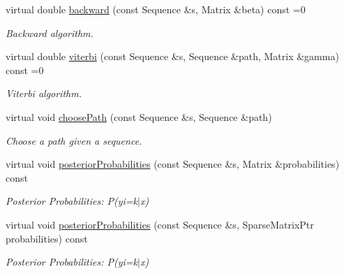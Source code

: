 \begin{DoxyCompactItemize}
virtual double \hyperlink{classtops_1_1DecodableModel_ae2339a90c124e65aabbb9887c04239ff}{backward} (const Sequence \&s, Matrix \&beta) const =0
\begin{DoxyCompactList}\small\item\em Backward algorithm. \end{DoxyCompactList}\item 
\mbox{\label{classtops_1_1DecodableModel_ab5e3ec33745b4189e8d466895fb51df8}} 
virtual double \hyperlink{classtops_1_1DecodableModel_ab5e3ec33745b4189e8d466895fb51df8}{viterbi} (const Sequence \&s, Sequence \&path, Matrix \&gamma) const =0
\begin{DoxyCompactList}\small\item\em Viterbi algorithm. \end{DoxyCompactList}\item 
\mbox{\label{classtops_1_1DecodableModel_a487a5950464543c60d748fb637f4ed7f}} 
virtual void \hyperlink{classtops_1_1DecodableModel_a487a5950464543c60d748fb637f4ed7f}{choose\+Path} (const Sequence \&s, Sequence \&path)
\begin{DoxyCompactList}\small\item\em Choose a path given a sequence. \end{DoxyCompactList}\item 
\mbox{\label{classtops_1_1DecodableModel_a5836caa71f5566958086c2fb79b93f22}} 
virtual void \hyperlink{classtops_1_1DecodableModel_a5836caa71f5566958086c2fb79b93f22}{posterior\+Probabilities} (const Sequence \&s, Matrix \&probabilities) const
\begin{DoxyCompactList}\small\item\em Posterior Probabilities\+: P(yi=k$\vert$x) \end{DoxyCompactList}\item 
\mbox{\label{classtops_1_1DecodableModel_af30ea49ef786a2477e6f8c1311181dd8}} 
virtual void \hyperlink{classtops_1_1DecodableModel_af30ea49ef786a2477e6f8c1311181dd8}{posterior\+Probabilities} (const Sequence \&s, Sparse\+Matrix\+Ptr probabilities) const
\begin{DoxyCompactList}\small\item\em Posterior Probabilities\+: P(yi=k$\vert$x) \end{DoxyCompactList}\item 

\end{DoxyCompactItemize}
